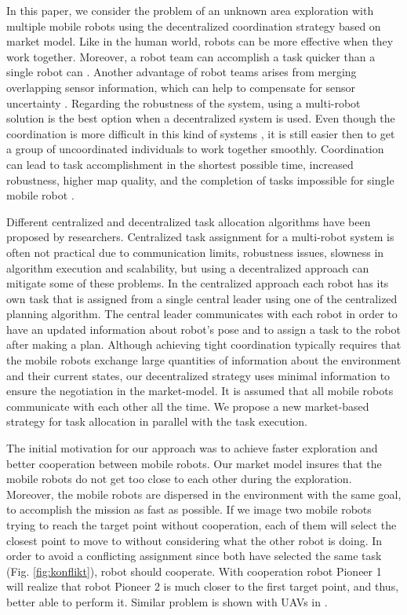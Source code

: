 \documentclass[letterpaper, 10 pt, conference]{ieeeconf}  %
\begin{document}
In this paper, we consider the problem of an unknown area exploration with multiple mobile robots using the decentralized coordination strategy based on market model. Like in the human world, robots can be more effective when they work together. Moreover, a robot team can accomplish a task quicker than a single robot can \cite{free-market}. Another advantage of robot teams arises from merging overlapping sensor information, which can help to compensate for sensor uncertainty \cite{segmentation}. Regarding the robustness of the system, using a multi-robot solution is the best option when a decentralized system is used. Even though the coordination is more difficult in this kind of systems \cite{Julia}, it is still easier then to get a group of uncoordinated individuals to work together smoothly.
Coordination can lead to task accomplishment in the shortest possible time, increased robustness, higher map quality, and the completion of tasks impossible for single mobile robot \cite{survey-analysis}. 

Different centralized and decentralized task allocation algorithms have been proposed by researchers. Centralized task assignment for a multi-robot system is often not practical due to communication limits, robustness issues, slowness in algorithm execution and scalability, but using a decentralized approach can mitigate some of these problems. 
In the centralized approach each robot has its own task that is assigned from a single central leader using one of the centralized planning algorithm. The central leader communicates with each robot in order to have an updated information about robot's pose and to assign a task to the robot after making a plan. Although achieving tight coordination typically requires that the mobile robots exchange large quantities of information about the environment and their current states, our decentralized strategy uses minimal information to ensure the negotiation in the market-model. It is assumed that all mobile robots communicate with each other all the time. We propose a new market-based strategy for task allocation in parallel with the task execution. 

The initial motivation for our approach was to achieve faster exploration and better cooperation between mobile robots. Our market model insures that the mobile robots do not get too close to each other during the exploration. Moreover, the mobile robots are dispersed in the environment with the same goal, to accomplish the mission as fast as possible. If we image two mobile robots trying to reach the target point without cooperation, each of them will select the closest point to move to without considering what the other robot is doing. In order to avoid a conflicting assignment since both have selected the same task (Fig. \ref{fig:konflikt}), robot should cooperate. With cooperation robot Pioneer 1 will realize that robot Pioneer 2 is much closer to the first target point, and thus, better able to perform it. Similar problem is shown with UAVs in \cite{mit}. 
\end{document}
